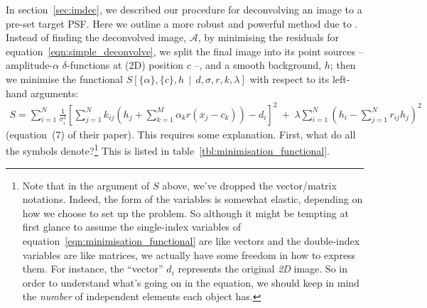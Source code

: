 \documentclass[letterpaper, 11pt]{article}
\begin{document}
In section~\ref{sec:imdec}, we described our procedure for deconvolving an image to a pre-set target PSF. Here we outline a more robust and powerful method due to \citet{MCS98}. Instead of finding the deconvolved image, $\mathcal A$, by minimising the residuals for equation~\ref{eqn:simple_deconvolve}, we split the final image into its point sources -- amplitude-$\alpha$ $\delta$-functions at (2D) position $c$ --, and a smooth background, $h$; then we minimise the functional $S\left[\{\alpha\},\{c\}, h \,\middle|\, {d}, {\sigma}, {r}, {k}, \lambda \right]$ with respect to its left-hand arguments:
\begin{align}
	S = \sum_{i=1}^N \frac{1}{\sigma_i^2} \left[ \sum_{j=1}^N k_{ij} \left(h_j +\sum_{k=1}^M \alpha_k r(x_j-c_k)\right) - d_i \right]^2\
			+\; \lambda\sum_{i=1}^N \left( h_i - \sum_{j=1}^N r_{ij}h_j \right)^2 \label{eqn:minimisation_functional}
\end{align}
(equation~(7) of their paper). This requires some explanation. First, what do all the symbols denote?\footnote{Note that in the argument of $S$ above, we've dropped the vector/matrix notations. Indeed, the form of the variables is somewhat elastic, depending on how we choose to set up the problem. So although it might be tempting at first glance to assume the single-index variables of equation~\ref{eqn:minimisation_functional} are like vectors and the double-index variables are like matrices, we actually have some freedom in how to express them. For instance, the ``vector'' $d_i$ represents the original \emph{2D} image. So in order to understand what's going on in the equation, we should keep in mind the \emph{number} of independent elements each object has.} This is listed in table~\ref{tbl:minimisation_functional}.
\end{document}
